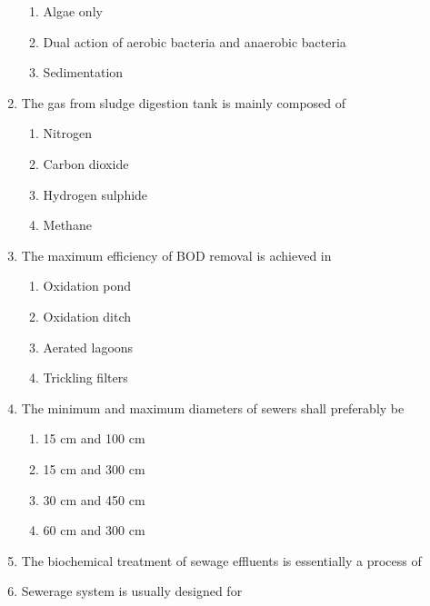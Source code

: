 \documentclass[11pt,a4paper]{article}
\begin{document}
\begin{enumerate}
\begin{enumerate}[label=\Alph*.]
\item{Algae only}
\item{Dual action of aerobic bacteria and anaerobic bacteria}
\item{Sedimentation}
\end{enumerate}
\item{The gas from sludge digestion tank is mainly composed of}
\begin{enumerate}[label=\Alph*.]
\item{Nitrogen}
\item{Carbon dioxide}
\item{Hydrogen sulphide}
\item{Methane}
\end{enumerate}
\item{The maximum efficiency of BOD removal is achieved in}
\begin{enumerate}[label=\Alph*.]
\item{Oxidation pond}
\item{Oxidation ditch}
\item{Aerated lagoons}
\item{Trickling filters}
\end{enumerate}
\item{The minimum and maximum diameters of sewers shall preferably be}
\begin{enumerate}[label=\Alph*.]
\item{15 cm and 100 cm}
\item{15 cm and 300 cm}
\item{30 cm and 450 cm}
\item{60 cm and 300 cm}
\end{enumerate}
\item{The biochemical treatment of sewage effluents is essentially a process of}
\\
\item{Sewerage system is usually designed for}
\\
\end{enumerate}
\end{document}
